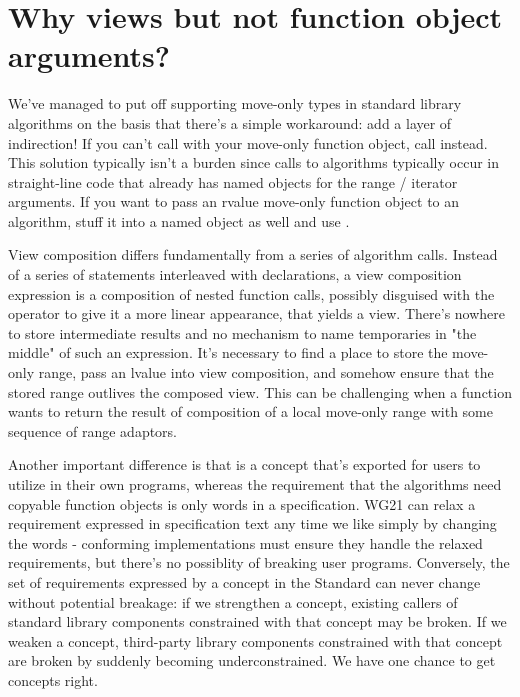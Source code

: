 \section{Why views but not function object arguments?}

We've managed to put off supporting move-only types in standard library
algorithms on the basis that there's a simple workaround: add a layer of
indirection! If you can't call
with your move-only function object, call
instead. This solution typically isn't a burden since calls to algorithms
typically occur in straight-line code that already has named objects for the
range / iterator arguments. If you want to pass an rvalue move-only function
object to an algorithm, stuff it into a named object as well and use
.

View composition differs fundamentally from a series of algorithm calls. Instead
of a series of statements interleaved with declarations, a view composition
expression is a composition of nested function calls, possibly disguised with
the \tcode{|} operator to give it a more linear appearance, that yields a view.
There's nowhere to store intermediate results and no mechanism to name
temporaries in "the middle" of such an expression. It's necessary to
find a place to store the move-only range, pass an lvalue into view composition,
and somehow ensure that the stored range outlives the composed view. This
can be challenging when a function wants to return the result of composition of
a local move-only range with some sequence of range adaptors.

Another important difference is that  is a concept that's exported
for users to utilize in their own programs, whereas the requirement that the
algorithms need copyable function objects is only words in a specification. WG21
can relax a requirement expressed in specification text any time we like simply
by changing the words - conforming implementations must ensure they handle the
relaxed requirements, but there's no possiblity of breaking user programs.
Conversely, the set of requirements expressed by a concept in the Standard can
never change without potential breakage: if we strengthen a concept, existing
callers of standard library components constrained with that concept may be
broken. If we weaken a concept, third-party library components constrained with
that concept are broken by suddenly becoming underconstrained. We have one
chance to get concepts right.


